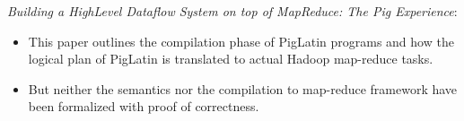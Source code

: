 \begin{frame}{\citet[VLDB][]{gates2009building}}
\emph{Building a HighLevel Dataflow System on top of MapReduce: The Pig
Experience}:
\begin{itemize}
	\item This paper outlines the compilation phase of PigLatin programs and how
          the logical plan of PigLatin is translated to actual Hadoop map-reduce
          tasks.
	\item But neither the semantics nor the compilation to map-reduce framework
          have been formalized with proof of correctness.
\end{itemize}
\end{frame}
